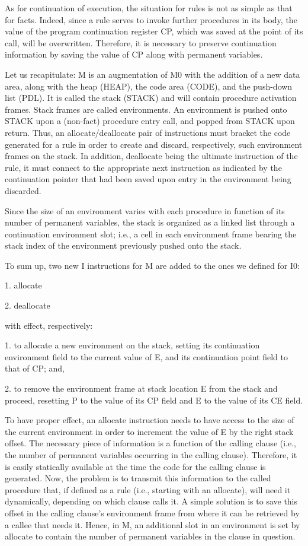 As for continuation of execution, the situation for rules is not as simple as that
for facts. Indeed, since a rule serves to invoke further procedures in its body, the
value of the program continuation register CP, which was saved at the point of
its call, will be overwritten. Therefore, it is necessary to preserve continuation
information by saving the value of CP along with permanent variables.

Let us recapitulate: M is an augmentation of M0 with the addition of a new data
area, along with the heap (HEAP), the code area (CODE), and the push-down list
(PDL). It is called the stack (STACK) and will contain procedure activation frames.
Stack frames are called environments. An environment is pushed onto STACK
upon a (non-fact) procedure entry call, and popped from STACK upon return.
Thus, an allocate/deallocate pair of instructions must bracket the code
generated for a rule in order to create and discard, respectively, such environment
frames on the stack. In addition, deallocate being the ultimate instruction
of the rule, it must connect to the appropriate next instruction as indicated by
the continuation pointer that had been saved upon entry in the environment being
discarded.

Since the size of an environment varies with each procedure in function of its
number of permanent variables, the stack is organized as a linked list through a
continuation environment slot; i.e., a cell in each environment frame bearing the
stack index of the environment previously pushed onto the stack.

To sum up, two new I instructions for M are added to the ones we defined for
I0:

1. allocate

2. deallocate

with effect, respectively:

1. to allocate a new environment on the stack, setting its continuation environment
field to the current value of E, and its continuation point field to that
of CP; and,

2. to remove the environment frame at stack location E from the stack and
proceed, resetting P to the value of its CP field and E to the value of its CE
field.

To have proper effect, an allocate instruction needs to have access to the size
of the current environment in order to increment the value of E by the right stack
offset. The necessary piece of information is a function of the calling clause (i.e.,
the number of permanent variables occurring in the calling clause). Therefore, it
is easily statically available at the time the code for the calling clause is generated.
Now, the problem is to transmit this information to the called procedure that, if
defined as a rule (i.e., starting with an allocate), will need it dynamically,
depending on which clause calls it. A simple solution is to save this offset in the
calling clause’s environment frame from where it can be retrieved by a callee that
needs it. Hence, in M, an additional slot in an environment is set by allocate
to contain the number of permanent variables in the clause in question.

